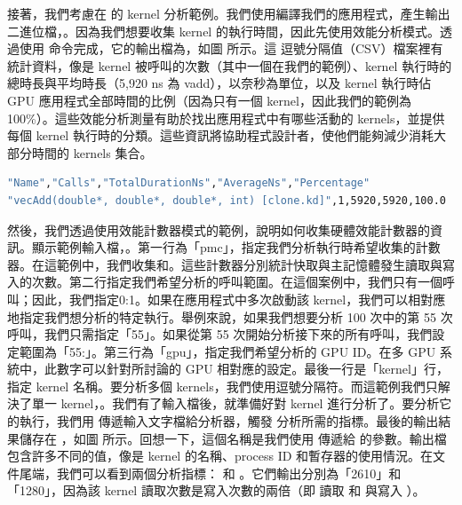 接著，我們考慮在  的  kernel 分析範例。我們使用編譯我們的應用程式，產生輸出二進位檔，。因為我們想要收集 kernel 的執行時間，因此先使用效能分析模式。透過使用  命令完成，它的輸出檔為，如圖 所示。這
逗號分隔值（CSV）檔案裡有統計資料，像是 kernel 被呼叫的次數（其中一個在我們的範例）、kernel 執行時的總時長與平均時長（5,920 ns 為 vadd），以奈秒為單位，以及 kernel 執行時佔 GPU 應用程式全部時間的比例（因為只有一個 kernel，因此我們的範例為100\%）。這些效能分析測量有助於找出應用程式中有哪些活動的 kernels，並提供每個 kernel 執行時的分類。這些資訊將協助程式設計者，使他們能夠減少消耗大部分時間的 kernels 集合。

\begin{lstlisting}[language=bash, caption={\term{rocProf} 在效能測量模式下的輸出結果}, label={lst:rocProf output}]
"Name","Calls","TotalDurationNs","AverageNs","Percentage"
"vecAdd(double*, double*, double*, int) [clone.kd]",1,5920,5920,100.0
\end{lstlisting}

然後，我們透過使用效能計數器模式的範例，說明如何收集硬體效能計數器的資訊。顯示範例輸入檔，。第一行為「pmc」，指定我們分析執行時希望收集的計數器。在這範例中，我們收集和。這些計數器分別統計快取與主記憶體發生讀取與寫入的次數。第二行指定我們希望分析的呼叫範圍。在這個案例中，我們只有一個呼叫；因此，我們指定0:1。如果在應用程式中多次啟動該 kernel，我們可以相對應地指定我們想分析的特定執行。舉例來說，如果我們想要分析 100 次中的第 55 次呼叫，我們只需指定「55」。如果從第 55 次開始分析接下來的所有呼叫，我們設定範圍為「55:」。第三行為「gpu」，指定我們希望分析的 GPU ID。在多 GPU 系統中，此數字可以針對所討論的 GPU 相對應的設定。最後一行是「kernel」行，指定 kernel 名稱。要分析多個 kernels，我們使用逗號分隔符。而這範例我們只解決了單一 kernel，。我們有了輸入檔後，就準備好對 kernel 進行分析了。要分析它的執行，我們用 傳遞輸入文字檔給分析器，觸發  分析所需的指標。最後的輸出結果儲存在 ，如圖  所示。回想一下，這個名稱是我們使用  傳遞給  的參數。輸出檔包含許多不同的值，像是 kernel 的名稱、process ID 和暫存器的使用情況。在文件尾端，我們可以看到兩個分析指標： 和 。它們輸出分別為「2610」和「1280」，因為該 kernel 讀取次數是寫入次數的兩倍（即  讀取  和  與寫入 ）。


